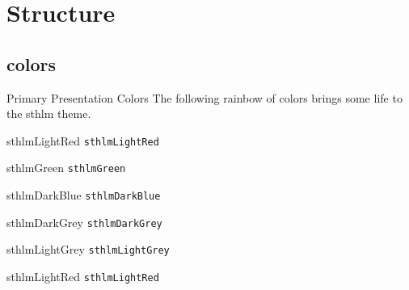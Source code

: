 \documentclass[compress]{beamer}
\begin{document}
\section{Structure}


\subsection{colors}


\begin{frame}{Primary Presentation Colors}
The following rainbow of colors brings some life to the sthlm theme.

\begin{multicols}{2}
	
\begin{beamercolorbox}[wd=\linewidth,ht=2ex,dp=0.7ex]{sthlmLightRed}
	\texttt{sthlmLightRed}
\end{beamercolorbox}

\begin{beamercolorbox}[wd=\linewidth,ht=2ex,dp=0.7ex]{sthlmGreen}
	\texttt{sthlmGreen}
\end{beamercolorbox}

\begin{beamercolorbox}[wd=\linewidth,ht=2ex,dp=0.7ex]{sthlmDarkBlue}
	\texttt{sthlmDarkBlue}
\end{beamercolorbox}

\begin{beamercolorbox}[wd=\linewidth,ht=2ex,dp=0.7ex]{sthlmDarkGrey}
	\texttt{sthlmDarkGrey}
\end{beamercolorbox}

\begin{beamercolorbox}[wd=\linewidth,ht=2ex,dp=0.7ex]{sthlmLightGrey}
	\texttt{sthlmLightGrey}
\end{beamercolorbox}


\begin{beamercolorbox}[wd=\linewidth,ht=2ex,dp=0.7ex]{sthlmLightRed}
	\texttt{sthlmLightRed}
\end{beamercolorbox}


\end{multicols}
\end{frame}
\end{document}

